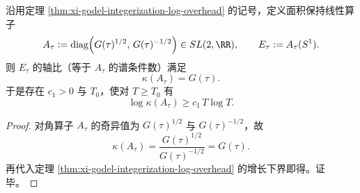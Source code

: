 \begin{theorem}\label{thm:xi-godel-ellipse-condition-number-distortion}
沿用定理 \ref{thm:xi-godel-integerization-log-overhead} 的记号，定义面积保持线性算子
\[
A_\tau:=\mathrm{diag}\!\left(G(\tau)^{1/2},\,G(\tau)^{-1/2}\right)\in SL(2,\RR),
\qquad
E_\tau:=A_\tau(S^1).
\]
则 \(E_\tau\) 的轴比（等于 \(A_\tau\) 的谱条件数）满足
\[
\kappa(A_\tau)=G(\tau).
\]
于是存在 \(c_1>0\) 与 \(T_0\)，使对 \(T\ge T_0\) 有
\[
\log \kappa(A_\tau)\ge c_1\,T\log T.
\]
\end{theorem}
\begin{proof}
对角算子 \(A_\tau\) 的奇异值为 \(G(\tau)^{1/2}\) 与 \(G(\tau)^{-1/2}\)，故
\[
\kappa(A_\tau)=\frac{G(\tau)^{1/2}}{G(\tau)^{-1/2}}=G(\tau).
\]
再代入定理 \ref{thm:xi-godel-integerization-log-overhead} 的增长下界即得。证毕。
\end{proof}

